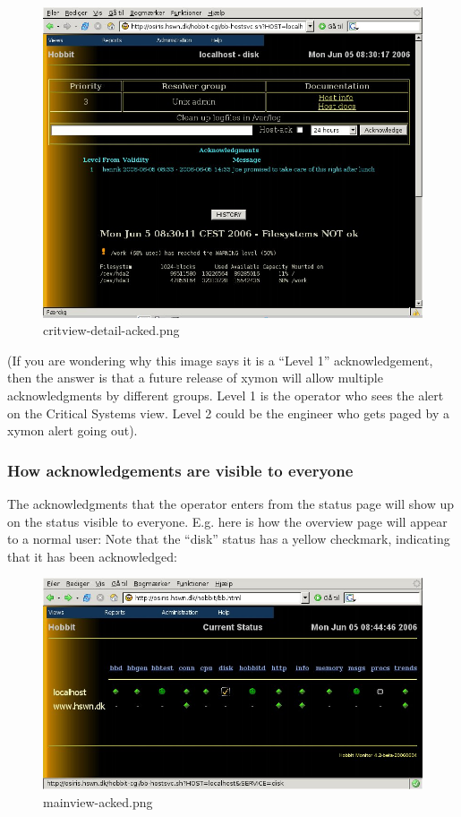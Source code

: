 \begin{figure} \centering \caption{critview-detail-acked.png}\label{critview-detail-acked.png}
\includegraphics[scale=0.5]{./critview-detail-acked.png} 
\end{figure}

 (If you are wondering why this image says it is a ``Level 1''
 acknowledgement, then the answer is that a future release of xymon
 will allow multiple acknowledgments by different groups. Level 1 is
 the operator who sees the alert on the Critical Systems view. Level 2
 could be the engineer who gets paged by a xymon alert going
 out).

\subsubsection{How acknowledgements are visible to everyone}


 The acknowledgments that the operator enters from the status page
 will show up on the status visible to everyone. E.g. here is how the
 overview page will appear to a normal user: Note that the ``disk''
 status has a yellow checkmark, indicating that it has been
 acknowledged: 

\begin{figure} \centering \caption{mainview-acked.png}\label{mainview-acked.png}
\includegraphics[scale=0.5]{./mainview-acked.png} 
\end{figure}

